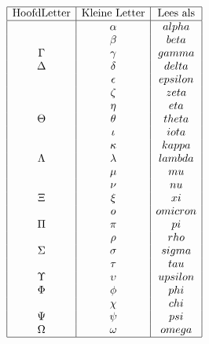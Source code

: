 \documentclass[lineaire_algebra_oplossingen.tex]{subfiles}
\begin{document}
\begin{center}
\[
\begin{array}{| c | c | c |}
\hline
\text{HoofdLetter} & \text{Kleine Letter}	& \text{Lees als}\\
\hline
			& \alpha	& alpha\\
			& \beta		& beta\\
\Gamma 		& \gamma 	& gamma\\
\Delta 		& \delta 	& delta\\
			& \epsilon	& epsilon\\
			& \zeta		& zeta\\
			& \eta 		& eta\\
\Theta 		& \theta 	& theta\\
			& \iota 	& iota\\
			& \kappa 	& kappa\\
\Lambda 	& \lambda	& lambda\\
			& \mu 		& mu\\
			& \nu 		& nu\\
\Xi 		& \xi 		& xi\\
			& o			& omicron\\
\Pi 		& \pi 		& pi\\
			& \rho 		& rho\\
\Sigma 		& \sigma 	& sigma\\
			& \tau 		& tau\\
\Upsilon 	& \upsilon 	& upsilon\\
\Phi 		& \phi 		& phi\\
			& \chi 		& chi\\
\Psi 		& \psi 		& psi\\
\Omega 		& \omega	& omega\\
\hline
\end{array}
\]
\end{center}
\end{document}
